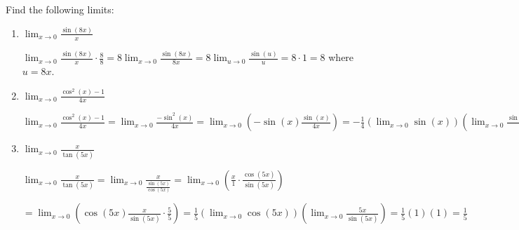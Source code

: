 \documentclass[nooutcomes]{ximera}
\begin{document}
\begin{problem}
Find the following limits:

	\begin{enumerate}
	
	\item  $\lim_{x \to 0} \frac{\sin(8x)}{x}$
			\begin{freeResponse}
			$\lim_{x \to 0} \frac{\sin(8x)}{x} \cdot \frac{8}{8}
			= 8 \lim_{x \to 0} \frac{\sin(8x)}{8x}
			= 8 \lim_{u \to 0} \frac{\sin(u)}{u}
			= 8 \cdot 1 = 8$  where $u = 8x$.  
			\end{freeResponse}
			
			
			
	\item  $\lim_{x \to 0} \frac{\cos^2(x) - 1}{4x}$
			\begin{freeResponse}
			$\lim_{x \to 0} \frac{\cos^2(x) - 1}{4x}
			= \lim_{x \to 0} \frac{- \sin^2(x)}{4x}
			= \lim_{x \to 0} \left(- \sin(x) \frac{\sin(x)}{4x} \right)
			= - \frac{1}{4} \left( \lim_{x \to 0} \sin(x) \right) \left( \lim_{x \to 0} \frac{\sin(x)}{x} \right)
			= - \frac{1}{4} (0) (1) = 0$
			\end{freeResponse}
			
			
			
	\item  $\lim_{x \to 0} \frac{x}{\tan(5x)}$
			\begin{freeResponse}
			$\lim_{x \to 0} \frac{x}{\tan(5x)}
			= \lim_{x \to 0} \frac{x}{\frac{\sin(5x)}{\cos(5x)}}
			= \lim_{x \to 0} \left( \frac{x}{1} \cdot \frac{\cos(5x)}{\sin(5x)} \right)$
			
			$= \lim_{x \to 0} \left( \cos(5x) \frac{x}{\sin(5x)} \cdot \frac{5}{5} \right)
			= \frac{1}{5} \left( \lim_{x \to 0} \cos(5x) \right) \left( \lim_{x \to 0} \frac{5x}{\sin(5x)} \right)
			= \frac{1}{5} (1) (1) = \frac{1}{5}$
			\end{freeResponse}
			
			
			
	\end{enumerate}
\end{problem}
	
	
	
	
			
			
\end{document}
